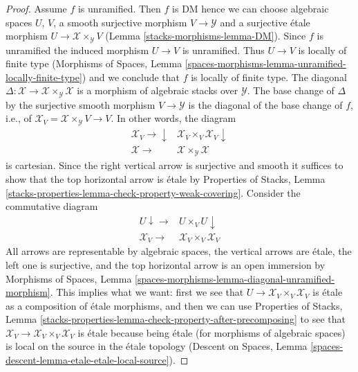\begin{proof}
Assume $f$ is unramified. Then $f$ is DM hence we can choose
algebraic spaces $U$, $V$, a smooth surjective morphism
$V \to \mathcal{Y}$ and a surjective \'etale morphism
$U \to \mathcal{X} \times_\mathcal{Y} V$ (Lemma \ref{stacks-morphisms-lemma-DM}).
Since $f$ is unramified the induced morphism $U \to V$ is unramified.
Thus $U \to V$ is locally of finite type
(Morphisms of Spaces, Lemma
\ref{spaces-morphisms-lemma-unramified-locally-finite-type})
and we conclude that $f$ is locally of finite type. The diagonal
$\Delta : \mathcal{X} \to \mathcal{X} \times_\mathcal{Y} \mathcal{X}$
is a morphism of algebraic stacks over $\mathcal{Y}$.
The base change of $\Delta$ by the surjective smooth morphism
$V \to \mathcal{Y}$ is the diagonal of the base change of
$f$, i.e., of $\mathcal{X}_V = \mathcal{X} \times_\mathcal{Y} V \to V$.
In other words, the diagram
$$
\begin{array}{cc}\mathcal{X}_V \longrightarrow\downarrow & \mathcal{X}_V \times_V \mathcal{X}_V \downarrow \\ \mathcal{X} \longrightarrow & \mathcal{X} \times_\mathcal{Y} \mathcal{X}\end{array}
$$
is cartesian. Since the right vertical arrow is surjective and smooth
it suffices to show that the top horizontal arrow is \'etale by
Properties of Stacks, Lemma
\ref{stacks-properties-lemma-check-property-weak-covering}.
Consider the commutative diagram
$$
\begin{array}{cc}U \downarrow\longrightarrow & U \times_V U \downarrow \\ \mathcal{X}_V \longrightarrow & \mathcal{X}_V \times_V \mathcal{X}_V\end{array}
$$
All arrows are representable by algebraic spaces,
the vertical arrows are \'etale, the left one is surjective, and
the top horizontal arrow is an open immersion by
Morphisms of Spaces, Lemma
\ref{spaces-morphisms-lemma-diagonal-unramified-morphism}.
This implies what we want: first we see that
$U \to \mathcal{X}_V \times_V \mathcal{X}_V$ is \'etale
as a composition of \'etale morphisms, and then we can use
Properties of Stacks, Lemma
\ref{stacks-properties-lemma-check-property-after-precomposing}
to see that $\mathcal{X}_V \to \mathcal{X}_V \times_V \mathcal{X}_V$
is \'etale because being \'etale (for morphisms of algebraic spaces)
is local on the source in the \'etale topology
(Descent on Spaces, Lemma \ref{spaces-descent-lemma-etale-etale-local-source}).


\end{proof}
